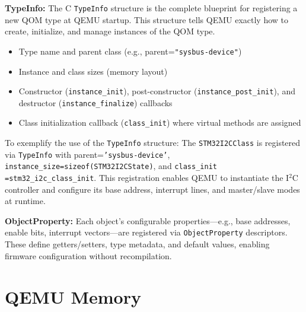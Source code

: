 \textbf{TypeInfo:} The C \texttt{TypeInfo} structure is the complete blueprint for registering 
a new QOM type at QEMU startup. This structure tells QEMU exactly how to create, initialize, 
and manage instances of the QOM type.



\begin{itemize}
    \item Type name and parent class (e.g., parent=\texttt{"sysbus-device"})
    \item Instance and class sizes (memory layout)
    \item Constructor (\texttt{instance\_init}), post-constructor (\texttt{instance\_post\_init}), and 
            destructor (\texttt{instance\_finalize}) callbacks
    \item Class initialization callback (\texttt{class\_init}) where virtual methods are assigned
\end{itemize}

To exemplify the use of the \texttt{TypeInfo} structure: The \texttt{STM32I2CClass} is registered via \texttt{TypeInfo} with 
parent=\texttt{'sysbus-device'}, \texttt{instance\_size=sizeof(STM32I2CState)}, and 
\texttt{class\_init} \texttt{=stm32\_i2c\_class\_init}. This registration enables QEMU to instantiate the I$^2$C 
controller and configure its base address, interrupt lines, and master/slave modes at 
runtime.

\textbf{ObjectProperty:} Each object's configurable properties—e.g., base addresses, 
enable bits, interrupt vectors—are registered via \texttt{ObjectProperty} descriptors. These 
define getters/setters, type metadata, and default values, enabling firmware 
configuration without recompilation.

\newpage
\section{QEMU Memory}
